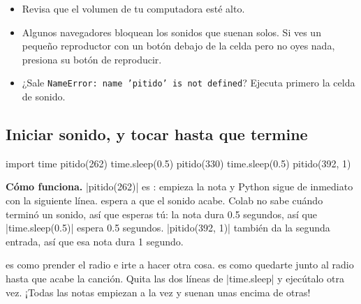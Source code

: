 \begin{watchout}
\begin{itemize}
  \item Revisa que el volumen de tu computadora esté alto.
  \item Algunos navegadores bloquean los sonidos que suenan solos. Si ves un pequeño reproductor con un botón \playbtn{} debajo de la celda pero no oyes nada, presiona su botón de reproducir.
  \item ¿Sale \texttt{NameError: name 'pitido' is not defined}? Ejecuta primero la celda de sonido.
\end{itemize}
\end{watchout}

\subsection*{Iniciar sonido, y tocar hasta que termine}

\begin{tcbraster}[raster columns=2, raster equal height=rows, raster column skip=12pt, raster valign=center]
\begin{tcolorbox}[colback=white, colframe=white, boxrule=0pt, valign=center]
\begin{scratch}[scale=0.8]
\end{scratch}
\end{tcolorbox}
\begin{code}
import time
pitido(262)
time.sleep(0.5)
pitido(330)
time.sleep(0.5)
pitido(392, 1)
\end{code}
\end{tcbraster}

\textbf{Cómo funciona.} \py|pitido(262)| es : empieza la nota y Python sigue de inmediato con la siguiente línea.  espera a que el sonido acabe. Colab no sabe cuándo terminó un sonido, así que esperas tú: la nota dura 0.5 segundos, así que \py|time.sleep(0.5)| espera 0.5 segundos. \py|pitido(392, 1)| también da la segunda entrada, así que esa nota dura 1 segundo.

\begin{think}
 es como prender el radio e irte a hacer otra cosa.  es como quedarte junto al radio hasta que acabe la canción. Quita las dos líneas de \py|time.sleep| y ejecútalo otra vez. ¡Todas las notas empiezan a la vez y suenan unas encima de otras!
\end{think}

